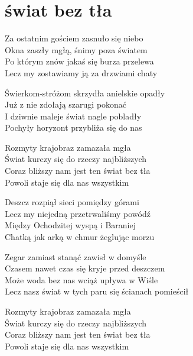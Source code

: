 \section{świat bez tła}
\begin{text}
Za ostatnim gościem zasnuło się niebo\\
Okna zaszły mgłą, śnimy poza światem\\
Po którym znów jakaś się burza przelewa\\
Lecz my zostawiamy ją za drzwiami chaty

Świerkom-stróżom skrzydła anielskie opadły\\
Już z nie zdołają szarugi pokonać\\
I dziwnie maleje świat nagle pobladły\\
Pochyły horyzont przybliża się do nas

Rozmyty krajobraz zamazała mgła\\
Świat kurczy się do rzeczy najbliższych\\
Coraz bliższy nam jest ten świat bez tła\\
Powoli staje się dla nas wszystkim

Deszcz rozpiął sieci pomiędzy górami\\
Lecz my niejedną przetrwaliśmy powódź\\
Między Ochodzitej wyspą i Baraniej\\
Chatką jak arką w chmur żeglując morzu

Zegar zamiast stanąć zawisł w domyśle\\
Czasem nawet czas się kryje przed deszczem\\
Może woda bez nas wciąż upływa w Wiśle\\
Lecz nasz świat w tych paru się ścianach pomieścił

Rozmyty krajobraz zamazała mgła\\
Świat kurczy się do rzeczy najbliższych\\
Coraz bliższy nam jest ten świat bez tła\\
Powoli staje się dla nas wszystkim
\end{text}